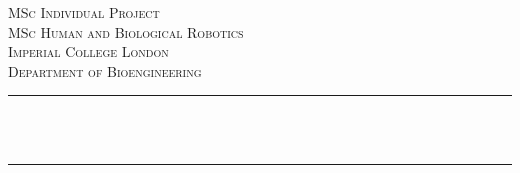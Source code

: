 \begin{titlepage}

\newcommand{\HRule}{\rule{\linewidth}{0.5mm}} %


\vspace*{2cm} %
 

\center %


\textsc{\huge MSc Individual Project}\\[0.5cm]
\textsc{\Large MSc Human and Biological Robotics}\\[1cm] %
\textsc{\huge Imperial College London}\\[0.5cm] %
\textsc{\Large Department of Bioengineering}\\[0.5cm] %

\makeatletter
\HRule \\[0.4cm]
{ \huge \bfseries \@title}\\[0.4cm] %
\HRule \\[1.5cm]
 


\end{titlepage}
